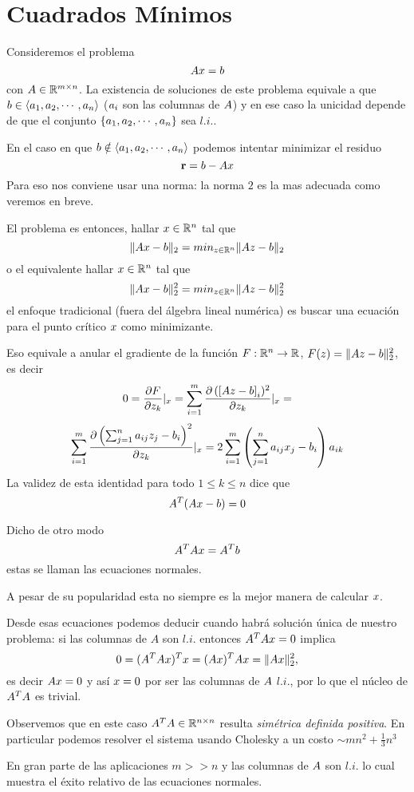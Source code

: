 \chapter{Cuadrados Mínimos}
Consideremos el problema
$$
\Ab\xb=\bb
$$
con $\Ab\in \Rmn$. La existencia de soluciones de este problema equivale a que 
$\bb\in \langle \ab_1,  \ab_2,\cdots , \ab_n\rangle$ ($\ab_{i}$ son las columnas de $\Ab$) y en ese caso la unicidad depende de que el conjunto 
$\{ \ab_1,  \ab_2,\cdots , \ab_n\}$ sea $l.i.$. 

En el caso en que $\bb\notin \langle  \ab_1,  \ab_2,\cdots , \ab_n\rangle$
podemos intentar minimizar el residuo
$$
\rb=\bb-\Ab\xb
$$
Para eso nos conviene usar una norma: la norma $2$  es la mas adecuada como veremos en breve.

El problema es entonces,  hallar $\xb\in \Rn$ tal que
$$
\|\Ab\xb-\bb\|_2=min_{\zb\in \Rn}\|\Ab\zb-\bb\|_2
$$
o el equivalente 
hallar $\xb\in \Rn$ tal que
$$
\|\Ab\xb-\bb\|_2^2=min_{\zb\in \Rn}\|\Ab\zb-\bb\|_2^2
$$
el enfoque tradicional (fuera del álgebra lineal numérica) es buscar una ecuación para el punto crítico $\xb$ como minimizante. 

Eso equivale a anular el gradiente de la función $F:\mathbb R^{n}\to \mathbb R$, $F(\zb)=\|\Ab\zb-\bb\|_2^2$, es decir
$$
0=\frac{\partial F}{\partial z_k}|_{\xb}=\sum_{i=1}^m\frac{\partial \left( [\Ab\zb-\bb \right]_i)^2}{\partial z_k}|_{\xb}=
$$
$$
\sum_{i=1}^m\frac{\partial \left( \sum_{j=1}^na_{ij}z_j-b_i \right)^2}{\partial z_k}|_{\xb}=2\sum_{i=1}^m\left( \sum_{j=1}^na_{ij}x_j-b_i\right)a_{ik}
$$
La validez de esta identidad para todo $1\le k\le n$ dice que 
$$
\Ab^T(\Ab\xb-\bb)=\cero
$$

Dicho de otro modo
$$
\Ab^T\Ab\xb=\Ab^T\bb
$$
estas se llaman las ecuaciones normales. 

A pesar de su popularidad esta no siempre es la mejor manera de calcular $\xb$.


Desde esas ecuaciones podemos deducir cuando habrá solución única de nuestro problema: si las columnas de $A$ son $l.i.$ entonces $\Ab^T\Ab\xb=\cero$ implica 
$$
0=(\Ab^T\Ab\xb)^T\xb=(\Ab\xb)^T\Ab\xb=\|\Ab\xb\|_2^2,
$$
es decir $\Ab\xb=\cero$ y así $\xb=\cero$ por ser las columnas de $\Ab$ $l.i.$, por lo que el núcleo de $\Ab^T\Ab$ es trivial.

Observemos que en este caso $\Ab^T\Ab\in \Rnn$ resulta \emph{simétrica definida positiva}.
En particular podemos resolver el sistema usando Cholesky a un costo $\sim mn^2+ \frac{1}{3}n^{3}$

En gran parte de las aplicaciones $m >> n$ y las columnas de $\Ab$ son $l.i.$ lo cual muestra el éxito relativo de las ecuaciones normales.
